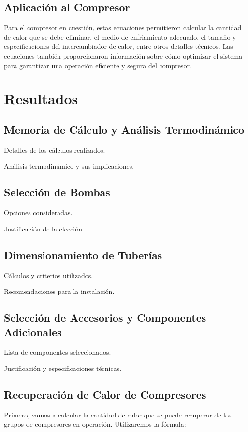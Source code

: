 \documentclass[11pt,a4paper]{article}  %
\begin{document}
\subsection{Aplicación al Compresor}

Para el compresor en cuestión, estas ecuaciones permitieron calcular la cantidad de calor que se debe eliminar, el medio de enfriamiento adecuado, el tamaño y especificaciones del intercambiador de calor, entre otros detalles técnicos. Las ecuaciones también proporcionaron información sobre cómo optimizar el sistema para garantizar una operación eficiente y segura del compresor.

\section{Resultados}

\subsection{Memoria de Cálculo y Análisis Termodinámico}
Detalles de los cálculos realizados.

Análisis termodinámico y sus implicaciones.

\subsection{Selección de Bombas}
Opciones consideradas.

Justificación de la elección.

\subsection{Dimensionamiento de Tuberías}
Cálculos y criterios utilizados.

Recomendaciones para la instalación.

\subsection{Selección de Accesorios y Componentes Adicionales}
Lista de componentes seleccionados.

Justificación y especificaciones técnicas.


\subsection{Recuperación de Calor de Compresores}
Primero, vamos a calcular la cantidad de calor que se puede recuperar de los grupos de compresores en operación. Utilizaremos la fórmula:
\end{document}
